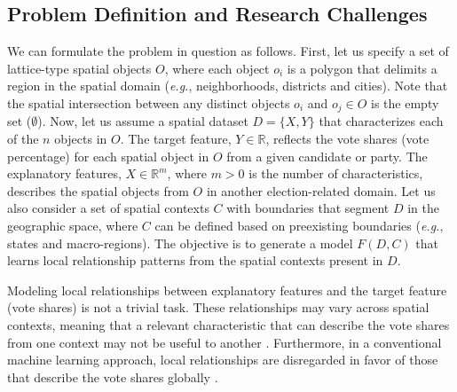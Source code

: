 \documentclass[runningheads]{llncs}
\begin{document}

\subsection{Problem Definition and Research Challenges}
\label{subsec:problem_definition}

We can formulate the problem in question as follows. First, let us specify a set of lattice-type spatial objects $O$, where each object $o_i$ is a polygon that delimits a region in the spatial domain (\textit{e.g.}, neighborhoods, districts and cities). Note that the spatial intersection between any distinct objects $o_i$ and $o_j \in O$ is the empty set ($\emptyset$). Now, let us assume a spatial dataset $D = \{X,Y\}$ that characterizes each of the $n$ objects in $O$. The target feature, $Y \in \mathbb{R}$, reflects the vote shares (vote percentage) for each spatial object in $O$ from a given candidate or party. The explanatory features, $X \in \mathbb{R}^m$, where $m > 0$ is the number of characteristics, describes the spatial objects from $O$ in another election-related domain. Let us also consider a set of spatial contexts $C$ with boundaries that segment $D$ in the geographic space, where $C$ can be defined based on preexisting boundaries (\textit{e.g.}, states and macro-regions). The objective is to generate a model $F(D,C)$ that learns local relationship patterns from the spatial contexts present in $D$. %

Modeling local relationships between explanatory features and the target feature (vote shares) is not a trivial task. These relationships may vary across spatial contexts, meaning that a relevant characteristic that can describe the vote shares from one context may not be useful to another \cite{stewart2021scale}. Furthermore, in a conventional machine learning approach, local relationships are disregarded in favor of those that describe the vote shares globally \cite{tiago2021graph,stewart2021scale}. %
\end{document}
